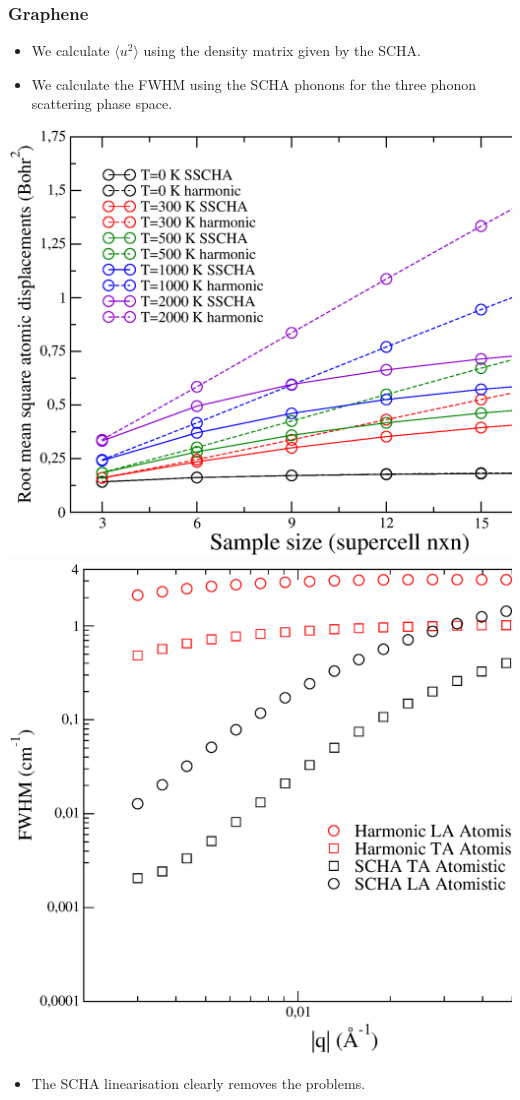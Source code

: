 \documentclass{beamer}
\begin{document}
\begin{frame}

 \frametitle{Graphene}
 \begin{itemize}
  \item We calculate $\langle u^{2}\rangle$ using the density matrix given by the SCHA.
  \item We calculate the FWHM using the SCHA phonons for the three phonon scattering phase space.
 \end{itemize}
 \begin{center}
  \includegraphics[width=0.53\linewidth]{Pictures/Graphene/rms.eps}
  \includegraphics[width=0.45\linewidth]{Pictures/Graphene/lwatomistic.eps}
 \end{center}
 \begin{itemize}
  \item The SCHA linearisation clearly removes the problems.
 \end{itemize}

\end{frame}

\end{document}
